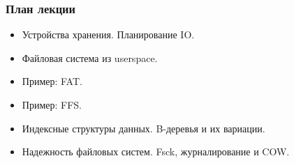 \begin{frame}
\frametitle{План лекции}
\begin{itemize}
  \item Устройства хранения. Планирование IO.
  \item Файловая система из userspace.
  \item Пример: FAT.
  \item Пример: FFS.
  \item Индексные структуры данных. B-деревья и их вариации.
  \item Надежность файловых систем. Fsck, журналирование и COW.
\end{itemize}
\end{frame}
